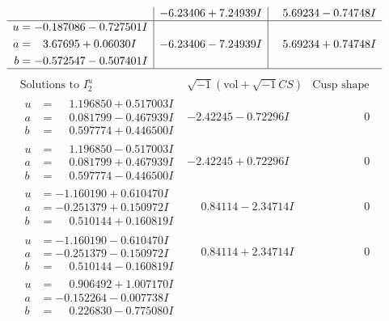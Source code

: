 \documentclass[1p]{elsarticle_modified}
\theoremstyle{definition}
\newcommand{\I}{\sqrt{-1}}
\begin{document}
$$\begin{array}{c|c|c}
 & -6.23406 + 7.24939 I & \phantom{-}5.69234 - 0.74748 I \\ \hline\begin{aligned}
u &= -0.187086 - 0.727501 I \\
a &= \phantom{-}3.67695 + 0.06030 I \\
b &= -0.572547 - 0.507401 I\end{aligned}
 & -6.23406 - 7.24939 I & \phantom{-}5.69234 + 0.74748 I\\
 \hline 
 \end{array}$$\newpage$$\begin{array}{c|c|c}  
\text{Solutions to }I^u_{2}& \I (\text{vol} + \sqrt{-1}CS) & \text{Cusp shape}\\
 \hline 
\begin{aligned}
u &= \phantom{-}1.196850 + 0.517003 I \\
a &= \phantom{-}0.081799 - 0.467939 I \\
b &= \phantom{-}0.597774 + 0.446500 I\end{aligned}
 & -2.42245 - 0.72296 I & \phantom{-0.000000 } 0 \\ \hline\begin{aligned}
u &= \phantom{-}1.196850 - 0.517003 I \\
a &= \phantom{-}0.081799 + 0.467939 I \\
b &= \phantom{-}0.597774 - 0.446500 I\end{aligned}
 & -2.42245 + 0.72296 I & \phantom{-0.000000 } 0 \\ \hline\begin{aligned}
u &= -1.160190 + 0.610470 I \\
a &= -0.251379 + 0.150972 I \\
b &= \phantom{-}0.510144 + 0.160819 I\end{aligned}
 & \phantom{-}0.84114 - 2.34714 I & \phantom{-0.000000 } 0 \\ \hline\begin{aligned}
u &= -1.160190 - 0.610470 I \\
a &= -0.251379 - 0.150972 I \\
b &= \phantom{-}0.510144 - 0.160819 I\end{aligned}
 & \phantom{-}0.84114 + 2.34714 I & \phantom{-0.000000 } 0 \\ \hline\begin{aligned}
u &= \phantom{-}0.906492 + 1.007170 I \\
a &= -0.152264 - 0.007738 I \\
b &= \phantom{-}0.226830 - 0.775080 I\end{aligned}

\end{array}$$
\end{document}
